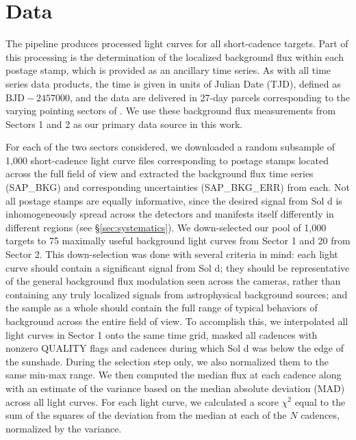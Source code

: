 \documentclass[modern]{aastex62}
\begin{document}
\section{Data}
\label{sec:data}

The \TESS pipeline produces processed light curves for all short-cadence targets. 
Part of this processing is the determination of the localized background flux 
within each postage stamp, which is provided as an ancillary time series. 
As with all \TESS time series data products, the time is given in units of \TESS Julian 
Date (TJD), defined as $\mathrm{BJD} - 2457000$, and the data are delivered in 27-day 
parcels corresponding to the varying pointing sectors of \TESS. 
We use these background flux measurements from Sectors 1 and 2 as our primary 
data source in this work. 

For each of the two sectors considered, we downloaded a random subsample of 
1,000 short-cadence light curve files corresponding to postage stamps located 
across the full \TESS field of view and extracted the background flux time 
series (\textsf{SAP\_BKG}) and corresponding uncertainties
(\textsf{SAP\_BKG\_ERR}) from each. 
Not all postage stamps are equally informative, since the desired signal from 
Sol d is inhomogeneously spread across the \TESS detectors and manifests itself
differently in different regions (see \S\ref{sec:systematics}). 
We down-selected our pool of 1,000 targets to 75 maximally useful background 
light curves from Sector 1 and 20 from Sector 2. 
This down-selection was done with several criteria in mind: each light curve 
should contain a significant signal from Sol d; they should be representative 
of the general background flux modulation seen across the \TESS cameras, rather 
than containing any truly localized signals from astrophysical background 
sources; and the sample as a whole should contain the full range of typical 
behaviors of background across the entire \TESS field of view. 
To accomplish this, we interpolated all light curves in Sector 1 onto the same time
grid, masked all cadences with nonzero \textsf{QUALITY} flags and
cadences during which Sol d was below the edge of the sunshade.
During the selection step only, we also normalized them to the same min-max range.
We then computed the median
flux at each cadence along with an estimate of the variance based on the
median absolute deviation (MAD) across all light curves.
For each light curve, we calculated a score $\chi^2$ equal to the sum of the squares of the
deviation from the median at each of the $N$ cadences, normalized by the variance.
\end{document}
